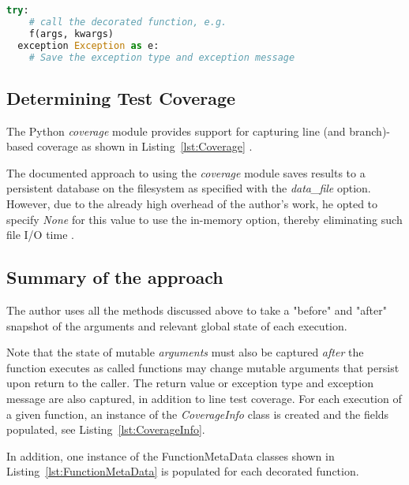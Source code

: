 \begin{lstlisting}[language=Python, caption={Catching and recording exceptions}, label={exceptions}]
  try:
    # call the decorated function, e.g.
    f(args, kwargs)
  exception Exception as e:
    # Save the exception type and exception message
  \end{lstlisting}

\subsection{Determining Test Coverage}\label{sec:approach-internal-4}
The Python \textit{coverage}
module provides support for capturing line (and branch)-based coverage
as shown in Listing~\ref{lst:Coverage} \cite{batchelder2024}.



The documented approach to using the \textit{coverage} module 
saves results to a persistent database on the filesystem as specified with the 
\textit{data\_file} option. However, due to the already high overhead of the 
author's work, he opted to specify \textit{None} for this value to use the in-memory 
option, thereby eliminating such file I/O time \cite{batchelder2024}.

\subsection{Summary of the approach}\label{sec:approach-internal-5}

The author uses all the methods discussed above to take a "before" and "after" 
snapshot of the arguments and relevant global state of each execution. 

Note that the state of mutable \textit{arguments} must also be captured 
\textit{after} the function executes as called functions may change mutable 
arguments that persist upon return to the caller. The return value or exception 
type and exception message are also captured, in addition to line test coverage. 
For each execution of a given function, an instance of the 
\textit{CoverageInfo} class is created and the fields populated, see 
Listing~\ref{lst:CoverageInfo}.


In addition, one instance of the FunctionMetaData classes shown in 
Listing~\ref{lst:FunctionMetaData} is populated for each decorated function.

